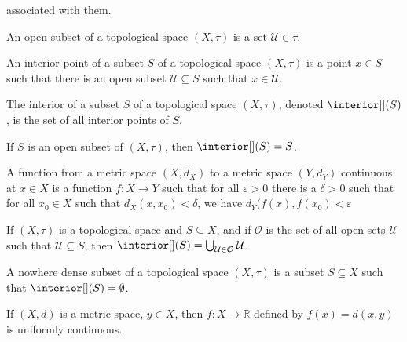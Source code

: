             associated with them.
            \begin{definition}
                An open subset of a topological space
                $(X,\tau)$ is a set $\mathcal{U}\in\tau$.
            \end{definition}
            \begin{definition}
                An interior point of a subset $S$ of a topological
                space $(X,\tau)$ is a point $x\in{S}$ such that
                there is an open subset $\mathcal{U}\subseteq{S}$
                such that $x\in\mathcal{U}$.
            \end{definition}
            \begin{definition}
                The interior of a subset $S$ of a topological
                space $(X,\tau)$, denoted $\interior[](S)$, is the set
                of all interior points of $S$.
            \end{definition}
            \begin{theorem}
                If $S$ is an open subset of
                $(X,\tau)$, then $\interior[](S)=S$.
            \end{theorem}
            \begin{definition}
                A function from a metric space
                $(X,d_{X})$ to a metric space $(Y,d_{Y})$
                continuous at $x\in{X}$ is a function
                $f:X\rightarrow{Y}$ such that
                for all $\varepsilon>0$ there is
                a $\delta>0$ such that for all
                $x_{0}\in{X}$ such that
                $d_{X}(x,x_{0})<\delta$, we have
                $d_{Y}(f(x),f(x_{0})<\varepsilon$
            \end{definition}
            \begin{theorem}
                If $(X,\tau)$ is a topological space and
                $S\subseteq{X}$, and if $\mathcal{O}$ is the set
                of all open sets $\mathcal{U}$ such that
                $\mathcal{U}\subseteq{S}$, then
                $\interior[](S)=%
                 \bigcup_{\mathcal{U}\in\mathcal{O}}\mathcal{U}$.
            \end{theorem}
            \begin{definition}
                A nowhere dense subset of a topological space
                $(X,\tau)$ is a subset $S\subseteq{X}$ such that
                $\interior[](S)=\emptyset$.
            \end{definition}
            \begin{theorem}
                If $(X,d)$ is a metric space,
                $y\in{X}$, then
                $f:X\rightarrow\mathbb{R}$ defined by
                $f(x)=d(x,y)$ is uniformly continuous.
            \end{theorem}
